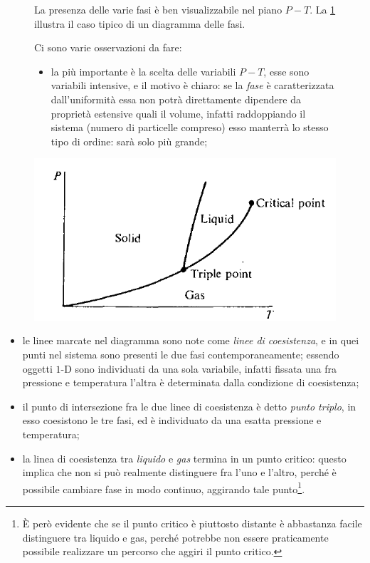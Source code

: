 \begin{figure}[H]
	\begin{minipage}{0.49\textwidth}
		La presenza delle varie fasi è ben visualizzabile nel piano $P-T$. La \cref{fig:phdiagr} illustra il caso tipico di un diagramma delle fasi.
		
		
		Ci sono varie osservazioni da fare:
		\begin{itemize}
			\item la più importante è la scelta delle variabili $P-T$, esse sono variabili intensive, e il motivo è chiaro: se la \textit{fase} è caratterizzata dall'uniformità essa non potrà direttamente dipendere da proprietà estensive quali il volume, infatti raddoppiando il sistema (numero di particelle compreso) esso manterrà lo stesso tipo di ordine: sarà solo più grande;
		\end{itemize}
	\end{minipage}
	\begin{minipage}{0.49\textwidth}
		\vspace{-30pt}
		\centering
		\includegraphics[width=\textwidth]{Immagini/PhaseDiagram.png}
		\caption{}
		\label{fig:phdiagr}
		\vspace{-30pt}
	\end{minipage}
\end{figure}


\begin{itemize}
	\item le linee marcate nel diagramma sono note come \textit{linee di coesistenza}, e in quei punti nel sistema sono presenti le due fasi contemporaneamente; essendo oggetti $1$-D sono individuati da una sola variabile, infatti fissata una fra pressione e temperatura l'altra è determinata dalla condizione di coesistenza;
	\item il punto di intersezione fra le due linee di coesistenza è detto \textit{punto triplo}, in esso coesistono le tre fasi, ed è individuato da una esatta pressione e temperatura;
	\item la linea di coesistenza tra \textit{liquido} e \textit{gas} termina in un punto critico: questo implica che non si può realmente distinguere fra l'uno e l'altro, perché è possibile cambiare fase in modo continuo, aggirando tale punto\footnote{\`E però evidente che se il punto critico è piuttosto distante è abbastanza facile distinguere tra liquido e gas, perché potrebbe non essere praticamente possibile realizzare un percorso che aggiri il punto critico.}.
\end{itemize}

